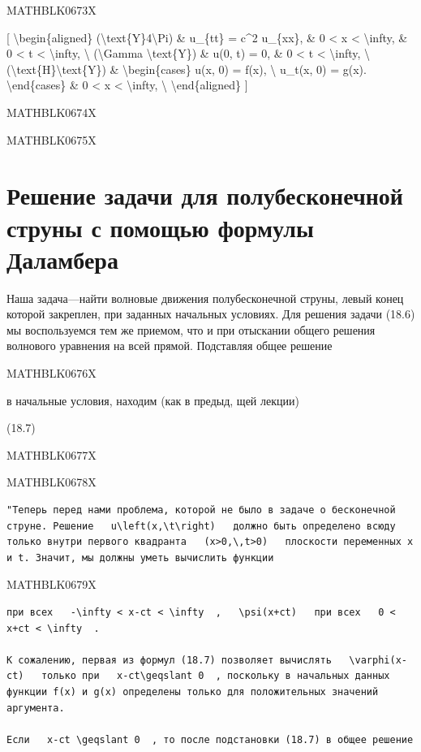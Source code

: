 \documentclass[
]{article}
\begin{document}
MATHBLK0673X

{[} \textbackslash begin\{aligned\}
(\textbackslash text\{Y\}4\textbackslash Pi) \& u\_\{tt\} = c\^{}2
u\_\{xx\}, \& 0 \textless{} x \textless{} \textbackslash infty, \& 0
\textless{} t \textless{} \textbackslash infty, \textbackslash{}
(\textbackslash Gamma \textbackslash text\{Y\}) \& u(0, t) = 0, \& 0
\textless{} t \textless{} \textbackslash infty, \textbackslash{}
(\textbackslash text\{H\}\textbackslash text\{Y\}) \&
\textbackslash begin\{cases\} u(x, 0) = f(x), \textbackslash{} u\_t(x,
0) = g(x). \textbackslash end\{cases\} \& 0 \textless{} x \textless{}
\textbackslash infty, \textbackslash{} \textbackslash end\{aligned\} {]}

MATHBLK0674X

MATHBLK0675X

\section{Решение задачи для полубесконечной струны с помощью формулы
Даламбера}\label{ux440ux435ux448ux435ux43dux438ux435-ux437ux430ux434ux430ux447ux438-ux434ux43bux44f-ux43fux43eux43bux443ux431ux435ux441ux43aux43eux43dux435ux447ux43dux43eux439-ux441ux442ux440ux443ux43dux44b-ux441-ux43fux43eux43cux43eux449ux44cux44e-ux444ux43eux440ux43cux443ux43bux44b-ux434ux430ux43bux430ux43cux431ux435ux440ux430}

Наша задача---найти волновые движения полубесконечной струны, левый
конец которой закреплен, при заданных начальных условиях. Для решения
задачи (18.6) мы воспользуемся тем же приемом, что и при отыскании
общего решения волнового уравнения на всей прямой. Подставляя общее
решение

MATHBLK0676X

в начальные условия, находим (как в предыд, щей лекции)

(18.7)

MATHBLK0677X

MATHBLK0678X

\begin{verbatim}
"Теперь перед нами проблема, которой не было в задаче о бесконечной струне. Решение   u\left(x,\t\right)   должно быть определено всюду только внутри первого квадранта   (x>0,\,t>0)   плоскости переменных x и t. Значит, мы должны уметь вычислить функции
\end{verbatim}

MATHBLK0679X

\begin{verbatim}
при всех   -\infty < x-ct < \infty  ,   \psi(x+ct)   при всех   0 < x+ct < \infty  .

К сожалению, первая из формул (18.7) позволяет вычислять   \varphi(x-ct)   только при   x-ct\geqslant 0  , поскольку в начальных данных функции f(x) и g(x) определены только для положительных значений аргумента.

Если   x-ct \geqslant 0  , то после подстановки (18.7) в общее решение
\end{verbatim}
\end{document}
